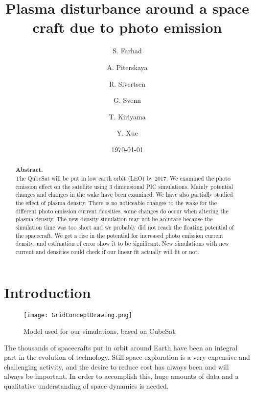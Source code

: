 \documentclass[aip, 
rsi, 
amsmath,
amssymb,
longbibliography,
preprint]{revtex4-1}
\begin{document}
\title[4th 4DSpace Workshop -- Team Godzilla -- Final Report]{Plasma disturbance around a space craft due to photo emission}

\author{S. Farhad} 
\author{A. Piterskaya}
\author{R. Sivertsen}
\author{G. Svenn}

\author{T. Kiriyama}
\author{Y. Xue}

\date{\today}

\begin{abstract}
\textbf{Abstract.}\\
The QubeSat will be put in low earth orbit (LEO) by 2017. We examined the photo emission effect on the satellite using 3 dimensional PIC simulations. Mainly potential changes and changes in the wake have been examined. We have also partially studied the effect of plasma density. There is no noticeable changes to the wake for the different photo emission current densities, some changes do occur when altering the plasma density. The new density simulation may not be accurate because the simulation time was too short and we probably did not reach the floating potential of the spacecraft. We get a rise in the potential for increased photo emission current density, and estimation of error show it to be significant. New simulations with new current and densities could check if our linear fit actually will fit or not.
\end{abstract}

\maketitle

\section{\label{sec:intro} Introduction}

\begin{figure*}[!ht]
\texttt{[image: GridConceptDrawing.png]}
\caption{Model used for our simulations, based on CubeSat.\label{fig:model}}
\end{figure*}

The thousands of spacecrafts put in orbit around Earth have been an integral part in the evolution of technology. Still space exploration is a very expensive and challenging activity, and the desire to reduce cost has always been and will always be important. In order to accomplish this, huge amounts of data and a qualitative understanding of space dynamics is needed. \\
\end{document}
